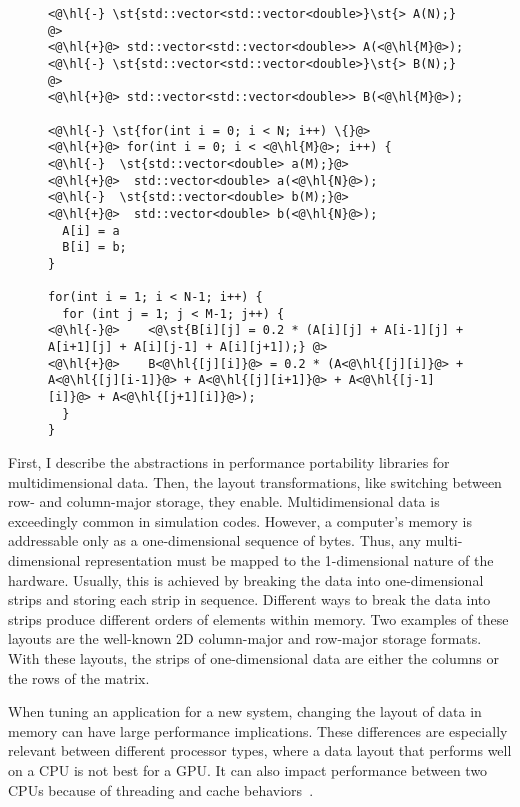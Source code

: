 \begin{figure}
\begin{lstlisting}[caption={Code changes required to switch from row- to column-major order in the C++ implementation of the 5 point stencil.},label=stencilCppColumn]
<@\hl{-} \st{std::vector<std::vector<double>}\st{> A(N);} @>
<@\hl{+}@> std::vector<std::vector<double>> A(<@\hl{M}@>);
<@\hl{-} \st{std::vector<std::vector<double>}\st{> B(N);} @>
<@\hl{+}@> std::vector<std::vector<double>> B(<@\hl{M}@>);

<@\hl{-} \st{for(int i = 0; i < N; i++) \{}@>
<@\hl{+}@> for(int i = 0; i < <@\hl{M}@>; i++) {
<@\hl{-}  \st{std::vector<double> a(M);}@>
<@\hl{+}@>  std::vector<double> a(<@\hl{N}@>);
<@\hl{-}  \st{std::vector<double> b(M);}@>
<@\hl{+}@>  std::vector<double> b(<@\hl{N}@>);
  A[i] = a
  B[i] = b;
}

for(int i = 1; i < N-1; i++) {
  for (int j = 1; j < M-1; j++) {
<@\hl{-}@>    <@\st{B[i][j] = 0.2 * (A[i][j] + A[i-1][j] + A[i+1][j] + A[i][j-1] + A[i][j+1]);} @>
<@\hl{+}@>    B<@\hl{[j][i]}@> = 0.2 * (A<@\hl{[j][i]}@> + A<@\hl{[j][i-1]}@> + A<@\hl{[j][i+1]}@> + A<@\hl{[j-1][i]}@> + A<@\hl{[j+1][i]}@>);
  }
}
\end{lstlisting}
\end{figure}

First, I describe the abstractions in performance portability libraries for multidimensional data.
Then, the layout transformations, like switching between row- and column-major storage, they enable.
Multidimensional data is exceedingly common in simulation codes.
However, a computer's memory is addressable only as a one-dimensional sequence of bytes.
Thus, any multi-dimensional representation must be mapped to the 1-dimensional nature of the hardware.
Usually, this is achieved by breaking the data into one-dimensional strips and storing each strip in sequence.
Different ways to break the data into strips produce different orders of elements within memory.
Two examples of these layouts are the well-known 2D column-major and row-major storage formats.
With these layouts, the strips of one-dimensional data are either the columns or the rows of the matrix.

When tuning an application for a new system, changing the layout of data in memory can have large performance implications.
These differences are especially relevant between different processor types, where a data layout that performs well on a CPU is not best for a GPU\@.
It can also impact performance between two CPUs because of threading and cache behaviors~\cite{trott2021kokkos}.

